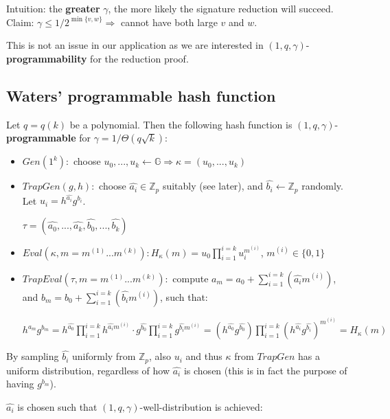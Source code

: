 \documentclass[oneside]{book}
\newcommand{\Z}[0]{\mathbb{Z}}
\newcommand{\G}[0]{\mathbb{G}}
\begin{document}
Intuition: the \textbf{greater} $\gamma$, the more likely the signature reduction will succeed.\\

Claim: $\gamma \le 1/2^{\min\{v,w\}} \Rightarrow$ cannot have both large $v$ and $w$.

This is not an issue in our application as we are interested in $(1, q, \gamma)$-\textbf{programmability} for the reduction proof.

\subsection{Waters' programmable hash function}
Let $q = q(k)$ be a polynomial. Then the following hash function is $(1,q,\gamma)$-\textbf{programmable} for $\gamma = 1/\Theta(q\sqrt{k})$:
\begin{itemize}
    \item $Gen(1^k):$ choose $u_0, ..., u_k \leftarrow \G \Rightarrow \kappa = (u_0, ..., u_k)$
    \item $TrapGen(g, h):$ choose $\widehat{a_i} \in \Z_p$ suitably (see later), and $\widehat{b_i} \leftarrow \Z_p$ randomly. Let $u_i = h^{\widehat{a_i}}g^{\widehat{b_i}}$.
    
    $\tau = (\widehat{a_0}, ..., \widehat{a_k}, \widehat{b_0}, ..., \widehat{b_k})$
    \item $Eval(\kappa, m = m^{(1)}...m^{(k)}): H_\kappa(m) = u_0 \prod_{i=1}^{i=k} u_i^{m^{(i)}}$, $m^{(i)} \in \{0,1\}$
    \item $TrapEval(\tau, m = m^{(1)}...m^{(k)}):$ compute $a_m = a_0 + \sum_{i = 1}^{i = k} \left(\widehat{a_i}m^{(i)}\right)$, and $b_m = b_0 + \sum_{i = 1}^{i = k} \left(\widehat{b_i}m^{(i)}\right)$, such that:
    
    ${\displaystyle h^{a_m}g^{b_m} = h^{\widehat{a_0}} \prod_{i = 1}^{i = k} h^{\widehat{a_i} m^{(i)}} \cdot g^{\widehat{b_0}} \prod_{i = 1}^{i = k} g^{\widehat{b_i}m^{(i)}} = \left(h^{\widehat{a_0}} g^{\widehat{b_0}}\right) \prod_{i = 1}^{i = k} \left(h^{\widehat{a_i}}g^{\widehat{b_i}}\right)^{m^{(i)}} = H_\kappa(m)}$
\end{itemize}

By sampling $\widehat{b_i}$ uniformly from $\Z_p$, also $u_i$ and thus $\kappa$ from $TrapGen$ has a uniform distribution, regardless of how $\widehat{a_i}$ is chosen (this is in fact the purpose of having $g^{b_m}$).

$\widehat{a_i}$ is chosen such that $(1, q, \gamma)$-well-distribution is achieved:
\end{document}
